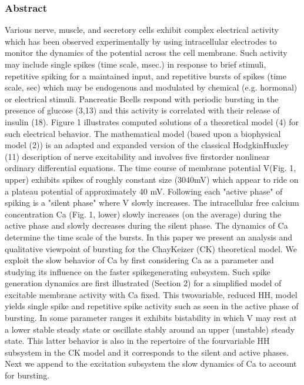 \documentclass[11pt]{article}
\begin{document}
\subsubsection{Abstract}
\label{sec:org8fcdec8}
Various nerve, muscle, and secretory cells exhibit complex electrical
activity which has been observed experimentally by using intracellular
electrodes to monitor the dynamics of the potential across the cell
membrane. Such activity may include single spikes (time scale, msec.)
in response to brief stimuli, repetitive spiking for a maintained
input, and repetitive bursts of spikes (time scale, sec) which may be
endogenous and modulated by chemical (e.g. hormonal) or electrical
stimuli. Pancreatic B­cells respond with periodic bursting in the
presence of glucose (3,13) and this activity is correlated with their
release of insulin (18). Figure 1 illustrates computed solutions of a
theoretical model (4) for such electrical behavior. The mathematical
model (based upon a biophysical model (2)) is an adapted and expanded
version of the classical Hodgkin­Huxley (11) description of nerve
excitability and involves five first­order nonlinear ordinary
differential equations. The time course of membrane potential V(Fig.
1, upper) exhibits spikes of roughly constant size (30­40mV) which
appear to ride on a plateau potential of approximately ­40 mV.
Following each "active phase" of spiking is a "silent phase" where V
slowly increases. The intracellular free calcium concentration Ca
(Fig. 1, lower) slowly increases (on the average) during the active
phase and slowly decreases during the silent phase. The dynamics of Ca
determine the time scale of the bursts. In this paper we present an
analysis and qualitative viewpoint of bursting for the Chay­Keizer
(C­K) theoretical model. We exploit the slow behavior of Ca by first
considering Ca as a parameter and studying its influence on the faster
spike­generating subsystem. Such spike generation dynamics are first
illustrated (Section 2) for a simplified model of excitable membrane
activity with Ca fixed. This two­variable, reduced HH, model yields
single spike and repetitive spike activity such as seen in the active
phase of bursting. In some parameter ranges it exhibits bistability in
which V may rest at a lower stable steady state or oscillate stably
around an upper (unstable) steady state. This latter behavior is also
in the repertoire of the four­variable HH subsystem in the C­K model
and it corresponds to the silent and active phases. Next we append to
the excitation subsystem the slow dynamics of Ca to account for
bursting.
\end{document}
